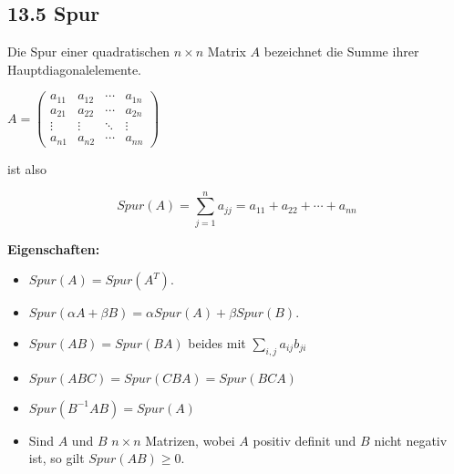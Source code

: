 \subsection{13.5 Spur}{
\vskip1pt

Die Spur einer quadratischen $n \times n$ Matrix $A$ bezeichnet die Summe ihrer Hauptdiagonalelemente.\par\vskip2pt

\begin{center}
$A=\begin{pmatrix}
	a_{11} & a_{12} & \cdots & a_{1n} \\
	a_{21} & a_{22} & \cdots & a_{2n} \\
	\vdots & \vdots & \ddots & \vdots \\
	a_{n1} & a_{n2} & \cdots & a_{nn}
	\end{pmatrix}$
\end{center}
\vspace{-5pt}

ist also\par\vspace{-15pt}
\begin{center}
\[Spur(A)=\sum_{j=1}^n a_{jj} = a_{11}+a_{22}+\dotsb+a_{nn}\]
\end{center}
\vspace{-5pt}

\textbf{Eigenschaften:}
\vspace{-3pt}

\begin{itemize}[leftmargin=0.29cm, itemsep=0.5pt]
\item $Spur(A) = Spur(A^T)$.
\item $Spur(\alpha A + \beta B) = \alpha Spur(A) + \beta Spur(B)$.
\item $Spur(AB) = Spur(BA)$ beides mit $\textstyle\sum_{i,j}a_{ij}b_{ji}$
\item $Spur(ABC) = Spur(CBA) = Spur(BCA)$
\item $Spur(B^{-1}AB) = Spur(A)$
\item Sind $A$ und $B$ $n\times n$ Matrizen, wobei $A$ positiv definit und $B$ nicht negativ ist, so gilt $Spur(AB) \geq 0$.
\end{itemize}

}
\colbreak
